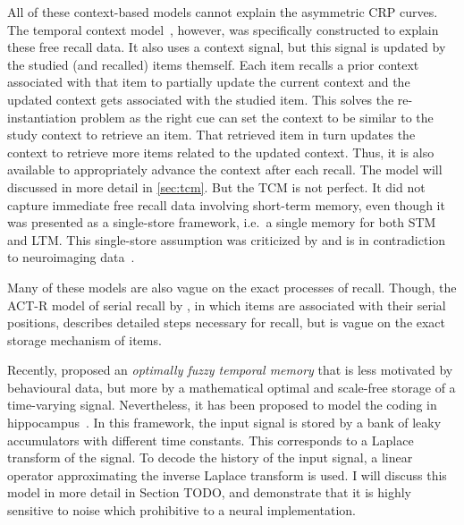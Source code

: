 All of these context-based models cannot explain the asymmetric CRP curves.
The temporal context model~\parencite{Howard2002}, however, was specifically constructed to explain these free recall data.
It also uses a context signal, but this signal is updated by the studied (and recalled) items themself.
Each item recalls a prior context associated with that item to partially update the current context and the updated context gets associated with the studied item.
This solves the re-instantiation problem as the right cue can set the context to be similar to the study context to retrieve an item.
That retrieved item in turn updates the context to retrieve more items related to the updated context.
Thus, it is also available to appropriately advance the context after each recall.
The model will discussed in more detail in \cref{sec:tcm}.
But the TCM is not perfect.
It did not capture immediate free recall data involving short-term memory, even though it was presented as a single-store framework, i.e.\ a single memory for both STM and LTM\@.
This single-store assumption was criticized by \textcite{Davelaar2008} and is in contradiction to neuroimaging data~\parencite{talmi2005}.

Many of these models are also vague on the exact processes of recall.
Though, the ACT-R model of serial recall by \textcite{Anderson1997}, in which items are associated with their serial positions, describes detailed steps necessary for recall, but is vague on the exact storage mechanism of items.

Recently, \textcite{shankar2013} proposed an \emph{optimally fuzzy temporal memory} that is less motivated by behavioural data, but more by a mathematical optimal and scale-free storage of a time-varying signal.
Nevertheless, it has been proposed to model the coding in hippocampus~\parencite{howard2014-1}.
In this framework, the input signal is stored by a bank of leaky accumulators with different time constants.
This corresponds to a Laplace transform of the signal.
To decode the history of the input signal, a linear operator approximating the inverse Laplace transform is used.
I will discuss this model in more detail in Section TODO, and demonstrate that it is highly sensitive to noise which prohibitive to a neural implementation.


